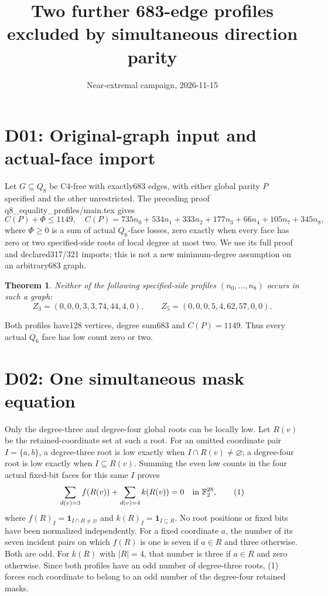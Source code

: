 \documentclass{article}
\newtheorem{theorem}{Theorem}
\begin{document}
\title{Two further 683-edge profiles excluded by simultaneous direction parity}
\author{Near-extremal campaign, 2026-11-15}
\maketitle

\section{D01: Original-graph input and actual-face import}
Let $G\subseteq Q_8$ be C4-free with exactly683 edges, with either global
parity $P$ specified and the other unrestricted. The preceding proof
q8\_equality\_profiles/main.tex gives
\[
 C(P)+\Phi\le1149,\quad
 C(P)=735n_0+534n_1+333n_2+177n_3+66n_4+105n_7+345n_8,
\]
where $\Phi\ge0$ is a sum of actual $Q_6$-face losses, zero exactly when
every face has zero or two specified-side roots of local degree at most
two. We use its full proof and declared317/321 imports; this is not a
new minimum-degree assumption on an arbitrary683 graph.

\begin{theorem}
Neither of the following specified-side profiles $(n_0,\ldots,n_8)$
occurs in such a graph:
\[
 Z_3=(0,0,0,3,3,74,44,4,0),\qquad
 Z_5=(0,0,0,5,4,62,57,0,0).
\]
\end{theorem}
Both profiles have128 vertices, degree sum683 and $C(P)=1149$.
Thus every actual $Q_6$ face has low count zero or two.

\section{D02: One simultaneous mask equation}
Only the degree-three and degree-four global roots can be locally low.
Let $R(v)$ be the retained-coordinate set at such a root.
For an omitted coordinate pair $I=\{a,b\}$, a degree-three root is low
exactly when $I\cap R(v)\ne\varnothing$; a degree-four root is low exactly
when $I\subseteq R(v)$. Summing the even low counts in the four actual
fixed-bit faces for this same $I$ proves
\[
 \sum_{d(v)=3} f(R(v)) +\sum_{d(v)=4} k(R(v))=0
       \quad\hbox{in }\mathbb F_2^{28},                       \tag{1}
\]
where $f(R)_I=\mathbf1_{I\cap R\ne\varnothing}$ and
$k(R)_I=\mathbf1_{I\subseteq R}$. No root positions or fixed bits have
been normalized independently.
For a fixed coordinate $a$, the number of its seven incident pairs on
which $f(R)$ is one is seven if $a\in R$ and three otherwise. Both are
odd. For $k(R)$ with $|R|=4$, that number is three if $a\in R$ and zero
otherwise. Since both profiles have an odd number of degree-three
roots, (1) forces each coordinate to belong to an odd number of the
degree-four retained masks.
\end{document}
